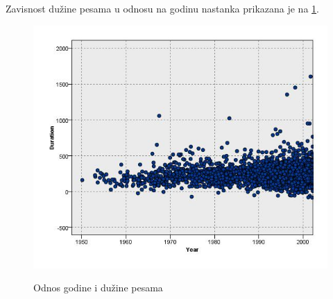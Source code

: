 Zavisnost du\v{z}ine pesama u odnosu na godinu nastanka prikazana je na \ref{fig:YearDuration}.
\begin{figure}[h]
    \includegraphics[scale=0.4]{resources/year-duration.jpg}
    \label{fig:YearDuration}
    \caption{Odnos godine i du\v{z}ine pesama}
\end{figure}

